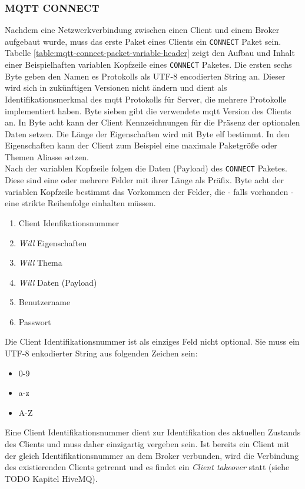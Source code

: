 \subsubsection{MQTT CONNECT}
Nachdem eine Netzwerkverbindung zwischen einen Client und einem Broker aufgebaut wurde, muss das erste Paket eines Clients ein \verb|CONNECT| Paket sein. Tabelle \ref{table:mqtt-connect-packet-variable-header} zeigt den Aufbau und Inhalt einer Beispielhaften variablen Kopfzeile eines \verb|CONNECT| Paketes. Die ersten sechs Byte geben den Namen es Protokolls als UTF-8 encodierten String an. Dieser wird sich in zukünftigen Versionen nicht ändern und dient als Identifikationsmerkmal des \ac{mqtt} Protokolls für Server, die mehrere Protokolle implementiert haben. Byte sieben gibt die verwendete \ac{mqtt} Version des Clients an. In Byte acht kann der Client Kennzeichnungen für die Präsenz der optionalen Daten setzen. Die Länge der Eigenschaften wird mit Byte elf bestimmt. In den Eigenschaften kann der Client zum Beispiel eine maximale Paketgrö{\ss}e oder Themen Aliasse setzen.\cite{mqtt5Specification}\\
Nach der variablen Kopfzeile folgen die Daten (Payload) des \verb|CONNECT| Paketes. Diese sind eine oder mehrere Felder mit ihrer Länge als Präfix. Byte acht der variablen Kopfzeile bestimmt das Vorkommen der Felder, die - falls vorhanden - eine strikte Reihenfolge einhalten müssen.
\begin{enumerate}
    \item Client Idenfikationsnummer
    \item \textit{Will} Eigenschaften
    \item \textit{Will} Thema
    \item \textit{Will} Daten (Payload)
    \item Benutzername
    \item Passwort
\end{enumerate}
Die Client Identifikationsnummer ist als einziges Feld nicht optional. Sie muss ein UTF-8 enkodierter String aus folgenden Zeichen sein:
\begin{itemize}
    \item 0-9
    \item a-z
    \item A-Z
\end{itemize}
Eine Client Identifikationsnummer dient zur Identifikation des aktuellen Zustands des Clients und muss daher einzigartig vergeben sein. Ist bereits ein Client mit der gleich Identifikationsnummer an dem Broker verbunden, wird die Verbindung des existierenden Clients getrennt und es findet ein \textit{Client takeover} statt (siehe TODO Kapitel HiveMQ).\cite{mqtt5Specification}
